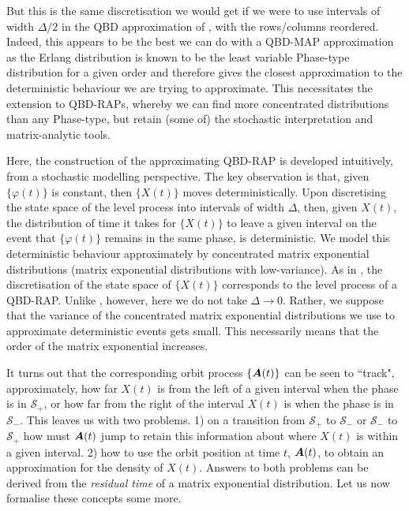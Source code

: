 But this is the same discretisation we would get if we were to use intervals of width \(\Delta/2\) in the QBD approximation of \cite{bo2013}, with the rows/columns reordered. Indeed, this appears to be the best we can do with a QBD-MAP approximation as the Erlang distribution is known to be the least variable Phase-type distribution for a given order \citep{as1987} and therefore gives the closest approximation to the deterministic behaviour we are trying to approximate. This necessitates the extension to QBD-RAPs, whereby we can find more concentrated distributions than any Phase-type, but retain (some of) the stochastic interpretation and matrix-analytic tools. 

Here, the construction of the approximating QBD-RAP is developed intuitively, from a stochastic modelling perspective. The key observation is that, given \(\{\varphi(t)\}\) is constant, then \(\{X(t)\}\) moves deterministically. Upon discretising the state space of the level process into intervals of width \(\Delta\), then, given \(X(t)\), the distribution of time it takes for \(\{X(t)\}\) to leave a given interval on the event that \(\{\varphi(t)\}\) remains in the same phase, is deterministic. We model this deterministic behaviour approximately by concentrated matrix exponential distributions (matrix exponential distributions with low-variance). As in \cite{bo2013}, the discretisation of the state space of \(\{X(t)\}\) corresponds to the level process of a QBD-RAP. Unlike  \cite{bo2013}, however, here we do not take \(\Delta \to 0\). Rather, we suppose that the variance of the concentrated matrix exponential distributions we use to approximate deterministic events gets small. This necessarily means that the order of the matrix exponential increases. 

It turns out that the corresponding orbit process \(\{\boldsymbol A(t)\}\) can be seen to ``track", approximately, how far \(X(t)\) is from the left of a given interval when the phase is in \(\mathcal S_+\), or how far from the right of the interval \(X(t)\) is when the phase is in \(\mathcal S_-\). This leaves us with two problems. 1) on a transition from \(\mathcal S_+\) to \(\mathcal S_-\) or \(\mathcal S_-\) to \(\mathcal S_+\) how must \(\boldsymbol A(t)\) jump to retain this information about where \(X(t)\) is within a given interval. 2) how to use the orbit position at time \(t\), \(\boldsymbol A(t)\), to obtain an approximation for the density of \(X(t)\). Answers to both problems can be derived from the \emph{residual time} of a matrix exponential distribution. Let us now formalise these concepts some more. 


